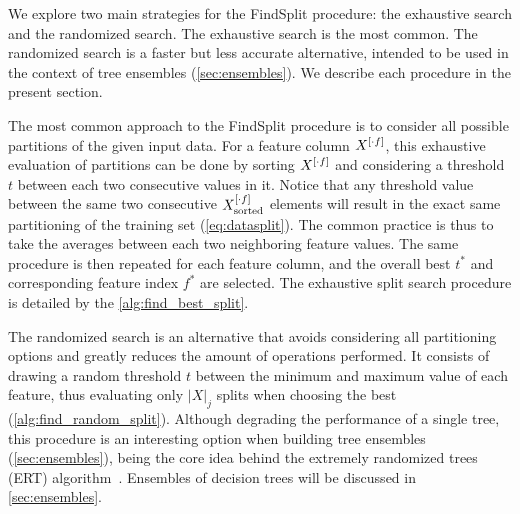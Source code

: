 We explore two main strategies for the FindSplit procedure: the exhaustive search and the randomized search. The exhaustive search is the most common. The randomized search is a faster but less accurate alternative, intended to be used in the context of tree ensembles (\autoref{sec:ensembles}). We describe each procedure in the present section.

The most common approach to the FindSplit procedure is to consider all possible partitions of the given input data.
%
For a feature column $X^{[\cdot f]}$, this exhaustive evaluation of partitions can be done by sorting $X^{[\cdot f]}$ and considering a threshold $t$ between each two consecutive values in it. Notice that any threshold value between the same two consecutive $X^{[\cdot f]}_\text{sorted}$ elements will result in the exact same partitioning of the training set (\autoref{eq:datasplit}). The common practice is thus to take the averages between each two neighboring feature values. The same procedure is then repeated for each feature column, and the overall best $t^\ast$ and corresponding feature index $f^\ast$ are selected.
%
%
The exhaustive split search procedure is detailed by the \autoref{alg:find_best_split}.

\algFindBestSplit

The randomized search is an alternative that avoids considering all partitioning options and greatly reduces the amount of operations performed.
It consists of drawing a random threshold $t$ between the minimum and maximum value of each feature, thus evaluating only $|X|_j$ splits when choosing the best (\autoref{alg:find_random_split}). Although degrading the performance of a single tree, this procedure is an interesting option when building tree ensembles (\autoref{sec:ensembles}), being the core idea behind the extremely randomized trees (ERT) algorithm~\cite{geurts2006extremely}.  %
Ensembles of decision trees will be discussed in \autoref{sec:ensembles}.

\algFindRandomSplit

